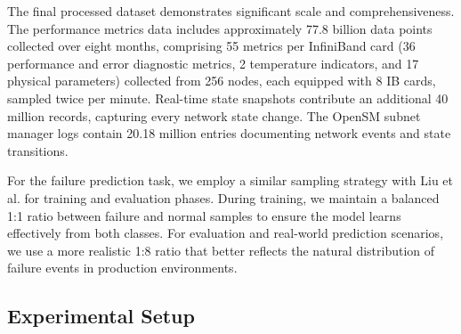 \documentclass[conference]{IEEEtran}
\begin{document}
The final processed dataset demonstrates significant scale and comprehensiveness. The performance metrics data includes approximately 77.8 billion data points collected over eight months, comprising 55 metrics per InfiniBand card (36 performance and error diagnostic metrics, 2 temperature indicators, and 17 physical parameters) collected from 256 nodes, each equipped with 8 IB cards, sampled twice per minute. Real-time state snapshots contribute an additional 40 million records, capturing every network state change. The OpenSM subnet manager logs contain 20.18 million entries documenting network events and state transitions. 

For the failure prediction task, we employ a similar sampling strategy with Liu et al. \cite{b8} for training and evaluation phases. During training, we maintain a balanced 1:1 ratio between failure and normal samples to ensure the model learns effectively from both classes. For evaluation and real-world prediction scenarios, we use a more realistic 1:8 ratio that better reflects the natural distribution of failure events in production environments. 

\subsection{Experimental Setup}
\end{document}
